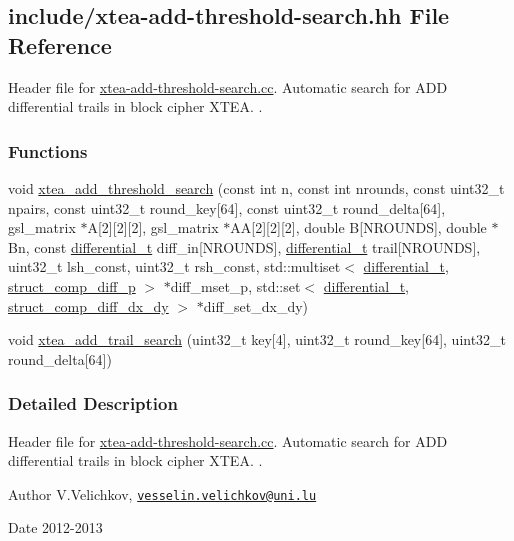 \hypertarget{xtea-add-threshold-search_8hh}{\subsection{include/xtea-\/add-\/threshold-\/search.hh \-File \-Reference}
\label{xtea-add-threshold-search_8hh}
}


\-Header file for \hyperlink{xtea-add-threshold-search_8cc}{xtea-\/add-\/threshold-\/search.\-cc}. \-Automatic search for \-A\-D\-D differential trails in block cipher \-X\-T\-E\-A. .  


\subsubsection*{\-Functions}
\begin{DoxyCompactItemize}
\item 
void \hyperlink{xtea-add-threshold-search_8hh_a18a7f48b1b44dcf0c408b2988cec4cf5}{xtea\-\_\-add\-\_\-threshold\-\_\-search} (const int n, const int nrounds, const uint32\-\_\-t npairs, const uint32\-\_\-t round\-\_\-key\mbox{[}64\mbox{]}, const uint32\-\_\-t round\-\_\-delta\mbox{[}64\mbox{]}, gsl\-\_\-matrix $\ast$\-A\mbox{[}2\mbox{]}\mbox{[}2\mbox{]}\mbox{[}2\mbox{]}, gsl\-\_\-matrix $\ast$\-A\-A\mbox{[}2\mbox{]}\mbox{[}2\mbox{]}\mbox{[}2\mbox{]}, double \-B\mbox{[}\-N\-R\-O\-U\-N\-D\-S\mbox{]}, double $\ast$\-Bn, const \hyperlink{structdifferential__t}{differential\-\_\-t} diff\-\_\-in\mbox{[}\-N\-R\-O\-U\-N\-D\-S\mbox{]}, \hyperlink{structdifferential__t}{differential\-\_\-t} trail\mbox{[}\-N\-R\-O\-U\-N\-D\-S\mbox{]}, uint32\-\_\-t lsh\-\_\-const, uint32\-\_\-t rsh\-\_\-const, std\-::multiset$<$ \hyperlink{structdifferential__t}{differential\-\_\-t}, \hyperlink{structstruct__comp__diff__p}{struct\-\_\-comp\-\_\-diff\-\_\-p} $>$ $\ast$diff\-\_\-mset\-\_\-p, std\-::set$<$ \hyperlink{structdifferential__t}{differential\-\_\-t}, \hyperlink{structstruct__comp__diff__dx__dy}{struct\-\_\-comp\-\_\-diff\-\_\-dx\-\_\-dy} $>$ $\ast$diff\-\_\-set\-\_\-dx\-\_\-dy)
\item 
void \hyperlink{xtea-add-threshold-search_8hh_a3fcd1eac7ae4338a32e79d7301c1fab0}{xtea\-\_\-add\-\_\-trail\-\_\-search} (uint32\-\_\-t key\mbox{[}4\mbox{]}, uint32\-\_\-t round\-\_\-key\mbox{[}64\mbox{]}, uint32\-\_\-t round\-\_\-delta\mbox{[}64\mbox{]})
\end{DoxyCompactItemize}


\subsubsection{\-Detailed \-Description}
\-Header file for \hyperlink{xtea-add-threshold-search_8cc}{xtea-\/add-\/threshold-\/search.\-cc}. \-Automatic search for \-A\-D\-D differential trails in block cipher \-X\-T\-E\-A. . \begin{DoxyAuthor}{\-Author}
\-V.\-Velichkov, \href{mailto:vesselin.velichkov@uni.lu}{\tt vesselin.\-velichkov@uni.\-lu} 
\end{DoxyAuthor}
\begin{DoxyDate}{\-Date}
2012-\/2013 
\end{DoxyDate}


